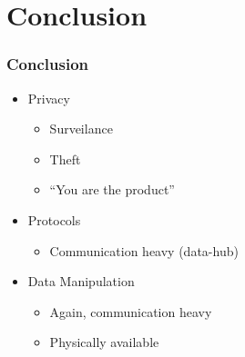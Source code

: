 
\section{Conclusion}

\begin{frame}
  \frametitle{Conclusion}

  \begin{itemize}
    \item Privacy
      \begin{itemize}
        \item Surveilance
        \item Theft
        \item ``You are the product''
      \end{itemize}
    \item Protocols
    \begin{itemize}
      \item Communication heavy (data-hub)
    \end{itemize}
    \item Data Manipulation
    \begin{itemize}
      \item Again, communication heavy
      \item Physically available
    \end{itemize}
  \end{itemize}
\end{frame}
